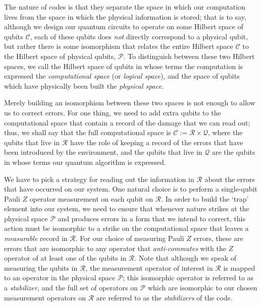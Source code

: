 \documentclass{amsbook}
\theoremstyle{plain}
\theoremstyle{definition}
\theoremstyle{remark}
\begin{document}
The nature of codes is that they separate the space in which our computation lives from the space in which the physical information is
stored; that is to say, although we design our quantum circuits to operate on some Hilbert space of qubits $\mathscr{C}$, each of these qubits
does \emph{not} directly correspond to a physical qubit, but rather there is some isomorphism that relates the entire Hilbert space $\mathscr{C}$
to the Hilbert space of physical qubits, $\mathscr{P}$.  To distinguish between these two Hilbert spaces, we call the Hilbert space of qubits in whose terms the computation is expressed the \emph{computational space} (or \emph{logical space}), and the space of qubits which have physically been built the
\emph{physical space}.

Merely building an isomorphism between these two spaces is not enough to allow us to correct errors.  For one thing, we need to add extra qubits to the computational space that contain a record of the damage that we can read out; thus, we shall say that the full computational space is $\mathscr{C}:=\mathscr{R}\times\mathscr{Q}$, where the qubits that live in $\mathscr{R}$ have the role of keeping a
record of the errors that have been introduced by the environment, and the qubits that live in $\mathscr{Q}$ are the qubits in whose terms our quantum
algorithm is expressed.  

We have to pick a strategy for reading out the information in $\mathscr{R}$ about the errors that have occurred on our system.  One natural choice is to perform a single-qubit Pauli $Z$ operator measurement on each qubit on $\mathscr{R}$.  In order to build the `trap' element into our system, we need to ensure that whenever nature strikes at the physical space $\mathscr{P}$ and produces errors in a form that we intend to correct, this action must be isomorphic to a strike on the computational space that leaves a \emph{measurable} record in $\mathscr{R}$.  For our choice of measuring Pauli $Z$ errors, these are errors that are isomorphic to any operator that \emph{anti-commutes} with the $Z$ operator of at least one of the qubits in $\mathscr{R}$.  Note that although we speak of measuring the qubits in $\mathscr{R}$, the measurement operator of interest in $\mathscr{R}$ is mapped to an operator in the physical space $\mathscr{P}$; this isomorphic operator is referred to as a \emph{stabilizer}, and the full set of operators on $\mathscr{P}$ which are isomorphic to our chosen measurement operators on $\mathscr{R}$ are referred to as the \emph{stabilizers} of the code.
\end{document}
